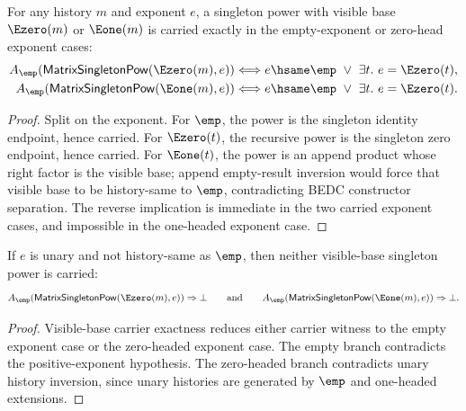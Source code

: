 \begin{theorem}
\label{thm:matrix-singleton-pow-visible-base-carrier-iff}
For any history $m$ and exponent $e$, a singleton power with visible base
$\Ezero(m)$ or $\Eone(m)$ is carried exactly in the empty-exponent or zero-head
exponent cases:
$$
\begin{aligned}
A_{\emp}(\mathsf{MatrixSingletonPow}(\Ezero(m),e))
&\Longleftrightarrow
e\hsame\emp\ \lor\ \exists t.\ e=\Ezero(t),\\
A_{\emp}(\mathsf{MatrixSingletonPow}(\Eone(m),e))
&\Longleftrightarrow
e\hsame\emp\ \lor\ \exists t.\ e=\Ezero(t).
\end{aligned}
$$
\end{theorem}
\begin{proof}
Split on the exponent. For $\emp$, the power is the singleton identity
endpoint, hence carried. For $\Ezero(t)$, the recursive power is the singleton
zero endpoint, hence carried. For $\Eone(t)$, the power is an append product
whose right factor is the visible base; append empty-result inversion would
force that visible base to be history-same to $\emp$, contradicting BEDC
constructor separation. The reverse implication is immediate in the two
carried exponent cases, and impossible in the one-headed exponent case.
\end{proof}

\begin{theorem}
\label{thm:matrix-singleton-pow-visible-base-positive-exponent-carrier-absurd}
If $e$ is unary and not history-same as $\emp$, then neither visible-base
singleton power is carried:
$$
A_{\emp}(\mathsf{MatrixSingletonPow}(\Ezero(m),e))\Rightarrow\bot
\qquad\text{and}\qquad
A_{\emp}(\mathsf{MatrixSingletonPow}(\Eone(m),e))\Rightarrow\bot.
$$
\end{theorem}
\begin{proof}
Visible-base carrier exactness reduces either carrier witness to the empty
exponent case or the zero-headed exponent case. The empty branch contradicts
the positive-exponent hypothesis. The zero-headed branch contradicts unary
history inversion, since unary histories are generated by $\emp$ and
one-headed extensions.
\end{proof}

